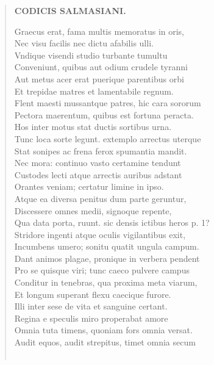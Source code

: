 \documentclass[11pt, a4paper]{report}
\begin{document}
\begin{verse}
    \begin{center} \textbf{CODICIS SALMASIANI.} \end{center} \marginpar{[45]} Graecus erat, fama multis memoratus in oris, \\ Nec visu facilis nec dictu afabilis ulli. \\ Vndique visendi studio turbante tumultu \\ Conveniunt, quibus aut odium crudele tyranni \\ Aut metus acer erat puerique parentibus orbi \\ Et trepidae matres et lamentabile regnum. \\ Flent maesti mussantque patres, hic cara sororum \\ Pectora maerentum, quibus est fortuna peracta. \\ Hos inter motus stat ductis sortibus urna. \\ Tunc loca sorte legunt. extemplo arrectus uterque \\ Stat sonipes ac frena ferox spumantia mandit. \\ Nec mora: continuo vasto certamine tendunt \\ Custodes lecti atque arrectis auribus adstant \\ Orantes veniam; certatur limine in ipso. \\ Atque ea diversa penitus dum parte geruntur, \\ Discessere omnes medii, signoque repente, \\ Qua data porta, ruunt. sic densis ictibus heros p. 1? \\ Stridore ingenti atque oculis vigilantibus exit, \\ Incumbens umero; sonitu quatit ungula campum. \\ Dant animos plagae, pronique in verbera pendent \\ Pro se quisque viri; tunc caeco pulvere campus \\ Conditur in tenebras, qua proxima meta viarum, \\ Et longum superant flexu caecique furore. \\ Illi inter sese de vita et sanguine certant. \\ Regina e speculis miro properabat amore \\ Omnia tuta timens, quoniam fors omnia versat. \\ Audit equos, audit strepitus, timet omnia secum \\ 
        ﻿\pagebreak 

\end{verse}
\end{document}
